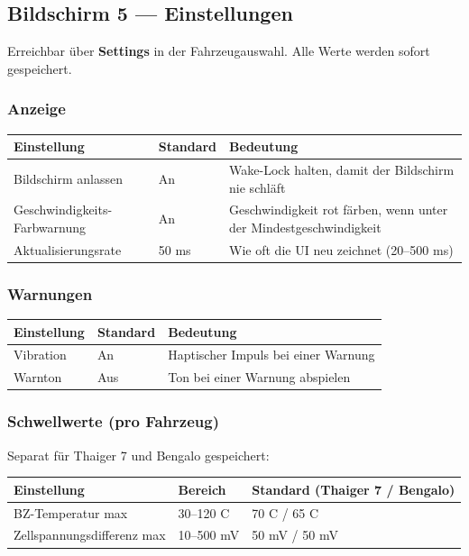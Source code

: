 \documentclass[11pt,a4paper,oneside]{report}
\newcommand{\degC}{\textdegree C}
\begin{document}
\subsection{Bildschirm 5 --- Einstellungen}
Erreichbar \"uber \textbf{Settings} in der Fahrzeugauswahl. Alle Werte werden
sofort gespeichert.

\subsubsection{Anzeige}

\begin{tabularx}{\linewidth}{@{}llL@{}}
\toprule
\textbf{Einstellung} & \textbf{Standard} & \textbf{Bedeutung}\\
\midrule
Bildschirm anlassen & An & Wake-Lock halten, damit der Bildschirm nie schl\"aft\\
Geschwindigkeits-Farbwarnung & An & Geschwindigkeit rot f\"arben, wenn unter der Mindestgeschwindigkeit\\
Aktualisierungsrate & 50 ms & Wie oft die UI neu zeichnet (20--500 ms)\\
\bottomrule
\end{tabularx}

\subsubsection{Warnungen}

\begin{tabularx}{\linewidth}{@{}llL@{}}
\toprule
\textbf{Einstellung} & \textbf{Standard} & \textbf{Bedeutung}\\
\midrule
Vibration & An & Haptischer Impuls bei einer Warnung\\
Warnton & Aus & Ton bei einer Warnung abspielen\\
\bottomrule
\end{tabularx}

\subsubsection{Schwellwerte (pro Fahrzeug)}
Separat f\"ur Thaiger 7 und Bengalo gespeichert:

\begin{tabularx}{\linewidth}{@{}llL@{}}
\toprule
\textbf{Einstellung} & \textbf{Bereich} & \textbf{Standard (Thaiger 7 / Bengalo)}\\
\midrule
BZ-Temperatur max & 30--120 \degC{} & 70 \degC{} / 65 \degC{}\\
Zellspannungsdifferenz max & 10--500 mV & 50 mV / 50 mV\\
\bottomrule
\end{tabularx}
\end{document}

